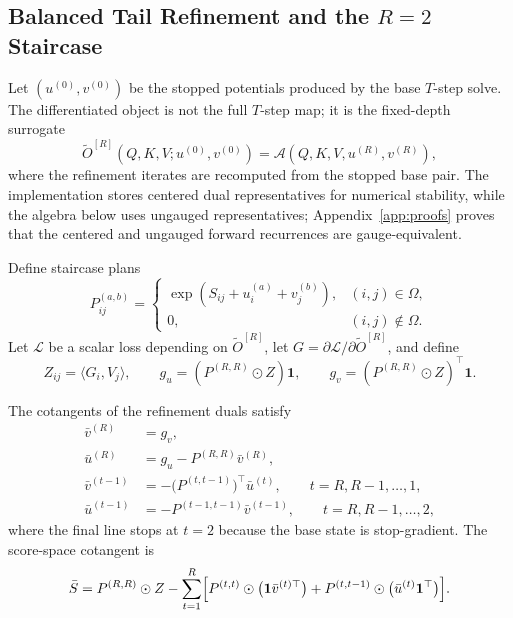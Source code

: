 \subsection{Balanced Tail Refinement and the \texorpdfstring{$R=2$}{R=2} Staircase}

Let $(u^{(0)},v^{(0)})$ be the stopped potentials produced by the base $T$-step solve. The differentiated object is not the full $T$-step map; it is the fixed-depth surrogate
\[
\widetilde O^{[R]}(Q,K,V;u^{(0)},v^{(0)}) = \mathcal{A}(Q,K,V,u^{(R)},v^{(R)}),
\]
where the refinement iterates are recomputed from the stopped base pair. The implementation stores centered dual representatives for numerical stability, while the algebra below uses ungauged representatives; Appendix~\ref{app:proofs} proves that the centered and ungauged forward recurrences are gauge-equivalent.

Define staircase plans
\[
P_{ij}^{(a,b)} =
\begin{cases}
\exp(S_{ij}+u_i^{(a)}+v_j^{(b)}), & (i,j)\in\Omega, \\
0, & (i,j)\notin\Omega.
\end{cases}
\]
Let $\mathcal{L}$ be a scalar loss depending on $\widetilde O^{[R]}$, let $G=\partial \mathcal{L}/\partial \widetilde O^{[R]}$, and define
\[
Z_{ij}=\langle G_i, V_j\rangle,
\qquad
g_u=(P^{(R,R)}\odot Z)\mathbf{1},
\qquad
g_v=(P^{(R,R)}\odot Z)^\top\mathbf{1}.
\]

\begin{proposition}\label{prop:tail_adjoint_main}
The cotangents of the refinement duals satisfy
\begin{align}
    \bar v^{(R)} &= g_v, \\
    \bar u^{(R)} &= g_u - P^{(R,R)}\bar v^{(R)}, \\
    \bar v^{(t-1)} &= -\bigl(P^{(t,t-1)}\bigr)^\top \bar u^{(t)}, \qquad t=R,R-1,\dots,1, \\
    \bar u^{(t-1)} &= -P^{(t-1,t-1)}\bar v^{(t-1)}, \qquad t=R,R-1,\dots,2,
\end{align}
where the final line stops at $t=2$ because the base state is stop-gradient. The score-space cotangent is
\begin{equation}
\label{eq:generic_score_vjp_unified}
\bar S
=
P^{(R,R)} \odot Z
-
\sum_{t=1}^R
\Bigl[
P^{(t,t)} \odot \bigl(\mathbf{1}\bar v^{(t)\top}\bigr)
+
P^{(t,t-1)} \odot \bigl(\bar u^{(t)}\mathbf{1}^\top\bigr)
\Bigr].
\end{equation}
\end{proposition}

